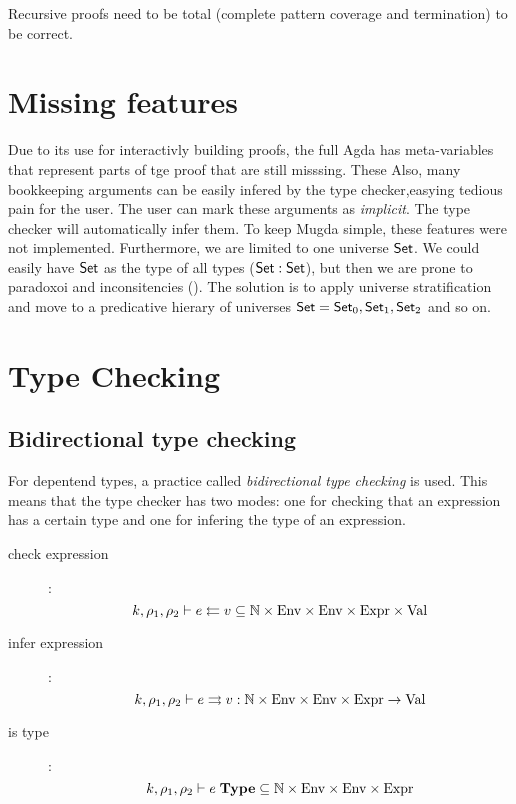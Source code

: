 Recursive proofs need to be total (complete pattern coverage and termination) to be correct.

\section{Missing features}
Due to its use for interactivly building proofs, the full Agda has meta-variables that represent parts of tge proof that are still misssing. These 
Also, many bookkeeping arguments can be easily infered by the type checker,easying tedious pain for the user.
The user can mark these arguments as \emph{implicit}. The type checker will automatically infer them.
To keep Mugda simple, these features were not implemented.
Furthermore, we are limited to one universe $\mathsf{Set}$.
We could easily have $\mathsf{Set}$ as the type of all types ($\mathsf{Set} : \mathsf{Set}$), but then we are prone to paradoxoi and inconsitencies (\cite{coquand86analysis,coquand92pattern}).
The solution is to apply universe stratification and move to a predicative hierary of universes $ \mathsf{Set} = \mathsf{Set}_0 , \mathsf{Set}_1 , \mathsf{Set}_2 $ and so on. 
\section{Type Checking}

\renewcommand\Check[5]{#1,#2,#3\vdash#4\leftleftarrows#5}
\newcommand\IsType[4]{#1,#2,#3\vdash#4\;\mathbf{Type}}
\newcommand\DataType[5]{#1,#2,#3,#4\vdash#5\;\mathbf{DataType}}
\newcommand\ConType[5]{#1,#2,#3,#4\vdash#5\;\mathbf{ConType}}
\newcommand\Infer[5]{#1,#2,#3\vdash#4\rightrightarrows#5}
\newcommand\EqVal[4]{#1,#2\vdash#3\Leftrightarrow#4}
\newcommand\FeqVal[4]{#1,#2\vdash#3{\;\leftrightarrow\;}#4}
\newcommand\DeqVal[2]{\vdash#1\leftrightarrow#2}
\newcommand\LeqVal[4]{#1,#2,\vdash#3\leq#4}
\newcommand\FleqVal[4]{#1,#2\vdash#3{\;\ll\;}#4}
\newcommand\DLeqVal[2]{\vdash#1\leq#2}
\newcommand\SzLeq[2]{\vdash#1\sqsubseteq#2}

\subsection{Bidirectional type checking} 
For depentend types, a practice called \emph{bidirectional type checking} is used.
This means that the type checker has two modes:
one for checking that an expression has a certain type and one for infering the type of an expression.

\begin{description}
\item[check expression]:
\[\Check{k}{\rho_1}{\rho_2}{e}{v} \subseteq \cN \times \Env \times \Env \times \Expr \times \Val\]
\item[infer expression]:
\[\Infer{k}{\rho_1}{\rho_2}{e}{v} : \cN \times \Env \times \Env \times \Expr \ra \Val\]
\item[is type]:
\[\IsType{k}{\rho_1}{\rho_2}{e} \subseteq \cN \times \Env \times \Env \times \Expr \]
\end{description}


